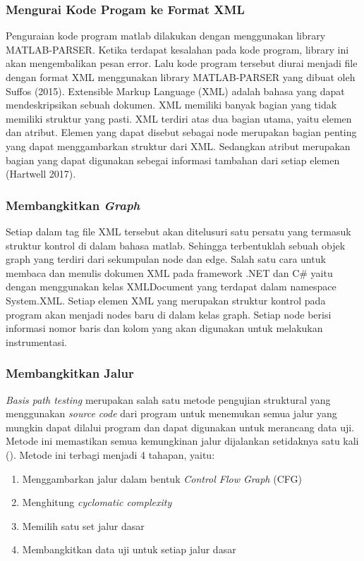 \subsubsection*{Mengurai Kode Progam ke Format XML}
Penguraian kode program matlab dilakukan dengan menggunakan library  MATLAB-PARSER. Ketika terdapat kesalahan pada kode program, library  ini akan mengembalikan pesan error. Lalu kode program tersebut diurai menjadi file dengan format XML menggunakan library MATLAB-PARSER yang dibuat oleh Suffos (2015). 
Extensible Markup Language (XML) adalah bahasa yang dapat mendeskripsikan sebuah dokumen. XML memiliki banyak bagian yang tidak memiliki struktur yang pasti. XML terdiri atas dua bagian utama, yaitu elemen dan atribut. Elemen yang dapat disebut sebagai node merupakan bagian penting yang dapat menggambarkan struktur dari XML. Sedangkan atribut merupakan bagian yang dapat digunakan sebegai informasi tambahan dari setiap elemen (Hartwell 2017). 

\subsubsection*{Membangkitkan \textit{Graph}}
Setiap dalam tag file XML tersebut akan ditelusuri satu persatu yang termasuk struktur kontrol di dalam bahasa matlab. Sehingga terbentuklah sebuah objek graph yang terdiri dari sekumpulan node dan edge. 
Salah satu cara untuk membaca dan menulis dokumen XML pada framework .NET dan C\# yaitu dengan menggunakan kelas XMLDocument yang terdapat dalam namespace System.XML. Setiap elemen XML yang merupakan struktur kontrol pada program akan menjadi nodes baru di dalam kelas graph. Setiap node berisi informasi nomor baris dan kolom yang akan digunakan untuk melakukan instrumentasi.


\subsubsection*{Membangkitkan Jalur}
\textit{Basis path testing} merupakan salah satu metode pengujian struktural yang menggunakan \textit{source code} dari program untuk menemukan semua jalur yang mungkin dapat dilalui program dan dapat digunakan untuk merancang data uji. Metode ini memastikan semua kemungkinan jalur dijalankan setidaknya satu kali (\cite{BASU2015}). Metode ini terbagi menjadi 4 tahapan, yaitu:
\begin{enumerate}[noitemsep] 
	\item Menggambarkan jalur dalam bentuk \textit{ Control Flow Graph} (CFG)
	\item Menghitung \textit{cyclomatic complexity}
	\item Memilih satu set jalur dasar
	\item Membangkitkan data uji untuk setiap jalur dasar
\end{enumerate}

